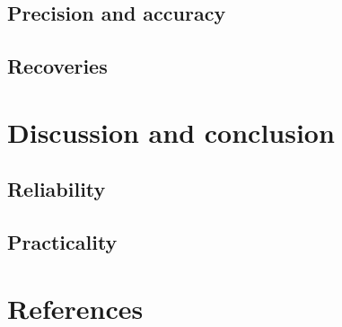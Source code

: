 \documentclass[journal=jacsat,manuscript=article]{achemso}
\begin{document}
\subsection{Precision and accuracy}
\subsection{Recoveries}

\section{Discussion and conclusion}
\subsection{Reliability}
\subsection{Practicality}



\section{References}
\printbibliography
\end{document}
